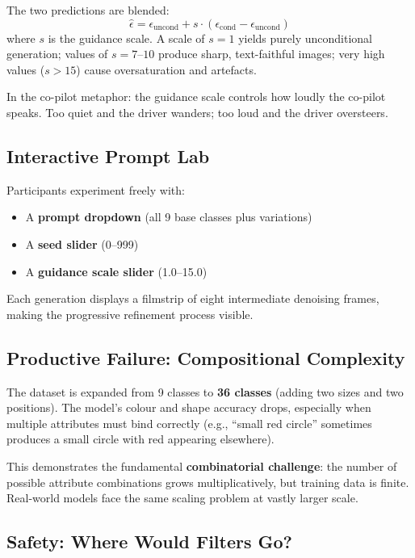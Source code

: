 \documentclass[11pt,a4paper]{article}
\begin{document}
The two predictions are blended:
\[
  \hat{\epsilon} = \epsilon_{\text{uncond}} + s \cdot
  (\epsilon_{\text{cond}} - \epsilon_{\text{uncond}})
\]
where $s$ is the guidance scale.  A scale of $s = 1$ yields purely
unconditional generation; values of $s = 7$--$10$ produce sharp,
text-faithful images; very high values ($s > 15$) cause oversaturation
and artefacts.

In the co-pilot metaphor: the guidance scale controls how loudly the
co-pilot speaks.  Too quiet and the driver wanders; too loud and the
driver oversteers.

\subsection{Interactive Prompt Lab}

Participants experiment freely with:
\begin{itemize}[nosep]
  \item A \textbf{prompt dropdown} (all 9 base classes plus variations)
  \item A \textbf{seed slider} (0--999)
  \item A \textbf{guidance scale slider} (1.0--15.0)
\end{itemize}

Each generation displays a filmstrip of eight intermediate denoising
frames, making the progressive refinement process visible.

\subsection{Productive Failure: Compositional Complexity}

The dataset is expanded from 9 classes to \textbf{36 classes} (adding
two sizes and two positions).  The model's colour and shape accuracy
drops, especially when multiple attributes must bind correctly (e.g.,
``small red circle'' sometimes produces a small circle with red appearing
elsewhere).

This demonstrates the fundamental \textbf{combinatorial challenge}:
the number of possible attribute combinations grows multiplicatively,
but training data is finite.  Real-world models face the same scaling
problem at vastly larger scale.

\subsection{Safety: Where Would Filters Go?}
\end{document}
